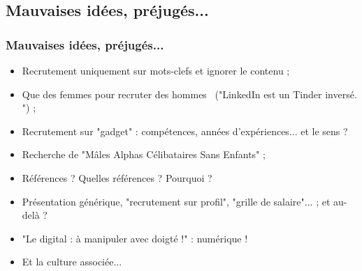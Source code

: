 \documentclass[slidetop,11pt]{beamer}
\begin{document}
\subsection{Mauvaises id{\'e}es, pr{\'e}jug{\'e}s...}
\begin{frame}
	\frametitle{Mauvaises id{\'e}es, pr{\'e}jug{\'e}s...}
	\begin{itemize}
		\item Recrutement uniquement sur mots-clefs et ignorer le contenu ; 
		\item Que des femmes pour recruter des hommes~\newline
			("LinkedIn est un Tinder invers{\'e}. ") ; 
		\item Recrutement sur "gadget" : comp{\'e}tences, ann{\'e}es d'exp{\'e}riences... et le sens ?
		\item Recherche de "M{\^a}les Alphas C{\'e}libataires Sans Enfants" ; 
		\item R{\'e}f{\'e}rences ? Quelles r{\'e}f{\'e}rences ? Pourquoi ?
		\item Pr{\'e}sentation g{\'e}n{\'e}rique, "recrutement sur profil", "grille de salaire"... ; et au-del{\`a} ? 
		\item "Le digital : {\`a} manipuler avec doigt{\'e} !" : num{\'e}rique !
		\item Et la culture associ{\'e}e... 
	\end{itemize}
\end{frame}
\end{document}
